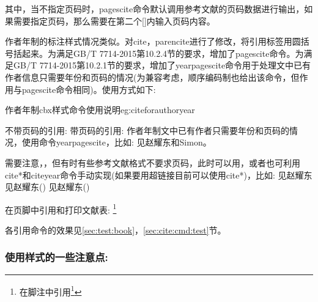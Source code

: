 其中，当不指定页码时，pagescite命令默认调用参考文献的页码数据进行输出，如果需要指定页码，那么需要在第二个[]内输入页码内容。

作者年制的标注样式情况类似。对cite，parencite进行了修改，将引用标签用圆括号括起来。为满足GB/T 7714-2015第10.2.4节的要求，增加了pagescite命令。为满足GB/T 7714-2015第10.2.1节的要求，增加了yearpagescite命令用于处理文中已有作者信息只需要年份和页码的情况(为兼容考虑，顺序编码制也给出该命令，但作用与pagescite命令相同)。使用方式如下:

\begin{example}{作者年制cbx样式命令使用说明}{eg:citeforauthoryear}
\begin{texlist}
不带页码的引用:
    \cite{Peebles2001-100-100}  \parencite{Miroslav2004--}
带页码的引用:
    \cite[见][49页]{蔡敏2006--} \parencite[见][49页]{Miroslav2004--}
     
作者年制文中已有作者只需要年份和页码的情况，使用命令yearpagescite，比如:
    见赵耀东和Simon。

需要注意，，但有时有些参考文献格式不要求页码，此时可以用，或者也可利用cite*和citeyear命令手动实现(如果要用超链接目前可以使用cite*)，比如:
    见赵耀东
    见赵耀东(\cite*{赵耀东1998--})
    见赵耀东(\citeyear{赵耀东1998--})
    
在页脚中引用和打印文献表:
    \footnote{在脚注中引用\footcite{赵学功2001--}} 
    \end{texlist}
\end{example}

各引用命令的效果见\ref{sec:test:book}，\ref{sec:cite:cmd:test}节。

\subsubsection{使用样式的一些注意点:}

